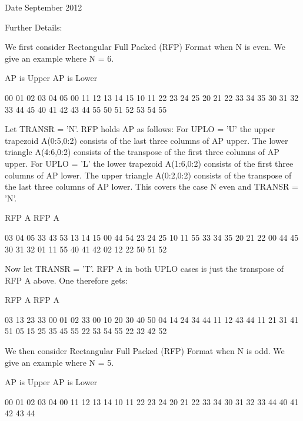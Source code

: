 \begin{DoxyDate}{Date}
September 2012 
\end{DoxyDate}
\begin{DoxyParagraph}{Further Details\+: }
\begin{DoxyVerb}  We first consider Rectangular Full Packed (RFP) Format when N is
  even. We give an example where N = 6.

      AP is Upper             AP is Lower

   00 01 02 03 04 05       00
      11 12 13 14 15       10 11
         22 23 24 25       20 21 22
            33 34 35       30 31 32 33
               44 45       40 41 42 43 44
                  55       50 51 52 53 54 55


  Let TRANSR = 'N'. RFP holds AP as follows:
  For UPLO = 'U' the upper trapezoid A(0:5,0:2) consists of the last
  three columns of AP upper. The lower triangle A(4:6,0:2) consists of
  the transpose of the first three columns of AP upper.
  For UPLO = 'L' the lower trapezoid A(1:6,0:2) consists of the first
  three columns of AP lower. The upper triangle A(0:2,0:2) consists of
  the transpose of the last three columns of AP lower.
  This covers the case N even and TRANSR = 'N'.

         RFP A                   RFP A

        03 04 05                33 43 53
        13 14 15                00 44 54
        23 24 25                10 11 55
        33 34 35                20 21 22
        00 44 45                30 31 32
        01 11 55                40 41 42
        02 12 22                50 51 52

  Now let TRANSR = 'T'. RFP A in both UPLO cases is just the
  transpose of RFP A above. One therefore gets:


           RFP A                   RFP A

     03 13 23 33 00 01 02    33 00 10 20 30 40 50
     04 14 24 34 44 11 12    43 44 11 21 31 41 51
     05 15 25 35 45 55 22    53 54 55 22 32 42 52


  We then consider Rectangular Full Packed (RFP) Format when N is
  odd. We give an example where N = 5.

     AP is Upper                 AP is Lower

   00 01 02 03 04              00
      11 12 13 14              10 11
         22 23 24              20 21 22
            33 34              30 31 32 33
               44              40 41 42 43 44



\end{DoxyVerb}
\end{DoxyParagraph}
